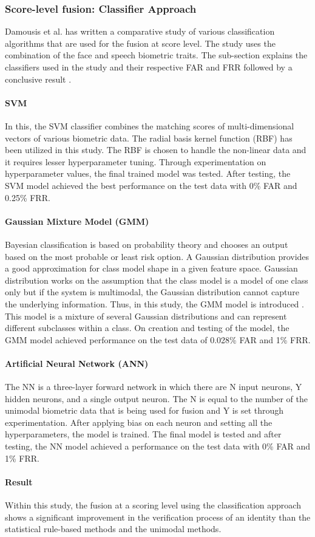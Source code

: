 \documentclass[a4paper, 12pt]{article}
\begin{document}
\subsubsection{Score-level fusion: Classifier Approach}
Damousis et al. has written a comparative study of various classification algorithms that are used for the fusion at score level. The study uses the combination of the face and speech biometric traits. The sub-section explains the classifiers used in the study and their respective FAR and FRR followed by a conclusive result \cite{damousis:2012}.
\noindent\paragraph{SVM} 
\noindent In this, the SVM classifier combines the matching scores of multi-dimensional vectors of various biometric data. The radial basis kernel function (RBF) has been utilized in this study. The RBF is chosen to handle the non-linear data and it requires lesser hyperparameter tuning. Through experimentation on hyperparameter values, the final trained model was tested. After testing, the SVM model achieved the best performance on the test data with 0\% FAR and 0.25\% FRR.
\noindent\paragraph{Gaussian Mixture Model (GMM)} 
\noindent Bayesian classification is based on probability theory and chooses an output based on the most probable or least risk option. A Gaussian distribution provides a good approximation for class model shape in a given feature space. Gaussian distribution works on the assumption that the class model is a model of one class only but if the system is multimodal, the Gaussian distribution cannot capture the underlying information. Thus, in this study, the GMM model is introduced \cite{damousis:2012}. This model is a mixture of several Gaussian distributions and can represent different subclasses within a class. On creation and testing of the model, the GMM model achieved performance on the test data of 0.028\% FAR and 1\% FRR.
\noindent\paragraph{Artificial Neural Network (ANN)} 
\noindent The NN is a three-layer forward network in which there are N input neurons, Y hidden neurons, and a single output neuron. The N is equal to the number of the unimodal biometric data that is being used for fusion and Y is set through experimentation. After applying bias on each neuron and setting all the hyperparameters, the model is trained. The final model is tested and after testing, the NN model achieved a performance on the test data with 0\% FAR and 1\% FRR.
\noindent\paragraph{Result} 
\noindent Within this study, the fusion at a scoring level using the classification approach shows a significant improvement in the verification process of an identity than the statistical rule-based methods and the unimodal methods.
\vskip 0.2in
\end{document}
